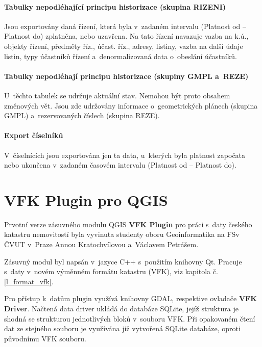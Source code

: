 \documentclass[a4paper,12pt,oneside]{book}
\begin{document}
\subsubsection{Tabulky nepodléhající principu historizace (skupina RIZENI)}

Jsou exportovány daná řízení, která byla v~zadaném intervalu (Platnost
od -- Platnost do) zplatněna, nebo uzavřena. Na tato řízení navazuje
vazba na k.ú., objekty řízení, předměty říz., účast. říz., adresy,
listiny, vazba na další údaje listin, typy účastníků řízení
a~denormalizovaná data o~obeslání účastníků. \cite{vfk_struktura}

\subsubsection{Tabulky nepodléhají principu historizace (skupiny GMPL a~REZE)}

U~těchto tabulek se udržuje aktuální stav. Nemohou být proto obsahem
změnových vět. Jsou zde udržovány informace o~geometrických plánech
(skupina GMPL) a~rezervovaných číslech (skupina
REZE). \cite{vfk_struktura}

\subsubsection{Export číselníků}

V~číselnících jsou exportována jen ta data, u~kterých byla platnost
započata nebo ukončena v~zadaném časovém intervalu (Platnost od --
Platnost do). \cite{vfk_struktura}


\clearpage
\chapter{VFK Plugin pro QGIS}
Prvotní verze zásuvného modulu QGIS \textbf{VFK Plugin} pro práci
s~daty českého katastru nemovitostí byla vyvinuta studenty oboru
Geoinformatika na FSv ČVUT v~Praze Annou Kratochvílovou a~Václavem
Petrášem.

Zásuvný modul byl napsán v~jazyce C++ s~použitím knihovny Qt. Pracuje
s~daty v~novém výměnném formátu katastru (VFK), viz kapitola
č. \ref{l_format_vfk}.

Pro přístup k~datům plugin využívá knihovny GDAL, respektive ovladače
\textbf{VFK Driver}. Načtená data driver ukládá do databáze SQLite,
jejíž struktura je shodná se strukturou jednotlivých bloků v~souboru
VFK. Při opakovaném čtení dat ze stejného souboru je využívána již
vytvořená SQLite databáze, oproti původnímu VFK souboru.
\end{document}
